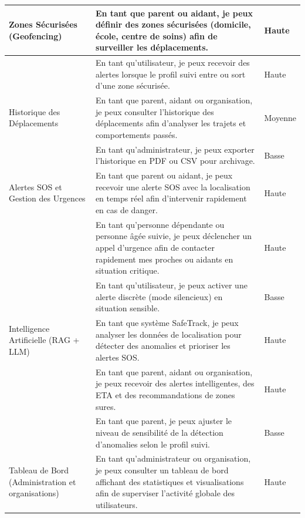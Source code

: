 \begin{longtable}{|>{\raggedright\arraybackslash}p{}|>{\raggedright\arraybackslash}p{}|>{\centering\arraybackslash}p{}|}
Zones Sécurisées (Geofencing) 
& En tant que parent ou aidant, je peux définir des zones sécurisées (domicile, école, centre de soins) afin de surveiller les déplacements. 
& Haute \\
\cline{2-3}
& En tant qu'utilisateur, je peux recevoir des alertes lorsque le profil suivi entre ou sort d'une zone sécurisée. 
& Haute \\
\hline

Historique des Déplacements 
& En tant que parent, aidant ou organisation, je peux consulter l'historique des déplacements afin d'analyser les trajets et comportements passés. 
& Moyenne \\
\cline{2-3}
& En tant qu'administrateur, je peux exporter l'historique en PDF ou CSV pour archivage. 
& Basse \\
\hline

Alertes SOS et Gestion des Urgences 
& En tant que parent ou aidant, je peux recevoir une alerte SOS avec la localisation en temps réel afin d'intervenir rapidement en cas de danger. 
& Haute \\
\cline{2-3}
& En tant qu'personne dépendante ou personne âgée suivie, je peux déclencher un appel d'urgence afin de contacter rapidement mes proches ou aidants en situation critique. 
& Haute \\
\cline{2-3}
& En tant qu'utilisateur, je peux activer une alerte discrète (mode silencieux) en situation sensible. 
& Basse \\
\hline

Intelligence Artificielle (RAG + LLM) 
& En tant que système SafeTrack, je peux analyser les données de localisation pour détecter des anomalies et prioriser les alertes SOS. 
& Haute \\
\cline{2-3}
& En tant que parent, aidant ou organisation, je peux recevoir des alertes intelligentes, des ETA et des recommandations de zones sures. 
& Haute \\
\cline{2-3}
& En tant que parent, je peux ajuster le niveau de sensibilité de la détection d'anomalies selon le profil suivi. 
& Basse \\
\hline

Tableau de Bord (Administration et organisations) 
& En tant qu'administrateur ou organisation, je peux consulter un tableau de bord affichant des statistiques et visualisations afin de superviser l'activité globale des utilisateurs. 
& Haute \\
\hline

\end{longtable}
\normalsize



